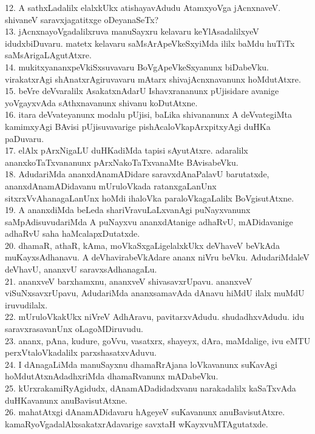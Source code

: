 \documentclass{article}
\begin{document}
12. A sathxLadalilx elalxkUkx atishayavAdudu AtamxyoVga jAcnxnaveV. shivaneV saravxjagatitxge oDeyanaSeTx?\\
13. jAcnxnayoVgadalilxruva manuSayxru kelavaru keYlAsadalilxyeV idudxbiDuvaru. matetx kelavaru saMsArApeVkeSxyiMda ililx baMdu huTiTx saMsArigaLAgutAtxre.\\
14. mukitxyananxpeVkiSxsuvavaru BoVgApeVkeSxyanunx biDabeVku. virakatxrAgi shAnatxrAgiruvavaru mAtarx shivajAcnxnavanunx hoMdutAtxre.\\
15. beVre deVvaralilx AsakatxnAdarU Ishavxrananunx pUjisidare avanige yoVgayxvAda sAthxnavanunx shivanu koDutAtxne.\\
16. itara deVvateyanunx modalu pUjisi, baLika shivananunx A deVvategiMta kamimxyAgi BAvisi pUjisuvavarige pishAcaloVkapArxpitxyAgi duHKa paDuvaru.\\
17. elAlx pArxNigaLU duHKadiMda tapisi sAyutAtxre. adaralilx ananxkoTaTxvananunx pArxNakoTaTxvanaMte BAvisabeVku.\\
18. AdudariMda ananxdAnamADidare saravxdAnaPalavU barutatxde, ananxdAnamADidavanu mUruloVkada ratanxgaLanUnx sitxrxVvAhanagaLanUnx hoMdi ihaloVka paraloVkagaLalilx BoVgisutAtxne.\\
19. A ananxdiMda beLeda shariVravuLaLxvanAgi puNayxvanunx saMpAdisuvudariMda A puNayxvu ananxdAtanige adhaRvU, mADidavanige adhaRvU saha haMcalapxDutatxde.\\
20. dhamaR, athaR, kAma, moVkaSxgaLigelalxkUkx deVhaveV beVkAda muKayxsAdhanavu. A deVhavirabeVkAdare ananx niVru beVku. AdudariMdaleV deVhavU, ananxvU saravxsAdhanagaLu.\\
21. ananxveV barxhamxnu, ananxveV shivasavxrUpavu. ananxveV viSuNxsavxrUpavu, AdudariMda ananxsamavAda dAnavu hiMdU ilalx muMdU iruvudilalx.\\
22. mUruloVkakUkx niVreV AdhAravu, pavitarxvAdudu. shudadhxvAdudu. idu saravxrasavanUnx oLagoMDiruvudu.\\
23. ananx, pAna, kudure, goVvu, vasatxrx, shayeyx, dAra, maMdalige, ivu eMTU perxVtaloVkadalilx parxshasatxvAduvu.\\
24. I dAnagaLiMda manuSayxnu dhamaRrAjana loVkavanunx suKavAgi hoMdutAtxnAdadhxriMda dhamaRvanunx mADabeVku.\\
25. kUrxrakamiRyAgidudx, dAnamADadidadxvanu narakadalilx kaSaTxvAda duHKavanunx anuBavisutAtxne.\\
26. mahatAtxgi dAnamADidavaru hAgeyeV suKavanunx anuBavisutAtxre. kamaRyoVgadalAlxsakatxrAdavarige savxtaH wKayxvuMTAgutatxde.\\
\end{document}
